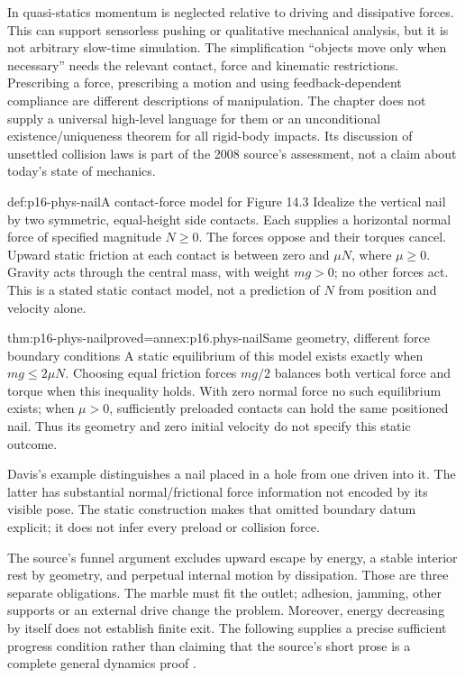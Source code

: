 In quasi-statics momentum is neglected relative to driving and dissipative
forces. This can support sensorless pushing or qualitative mechanical
analysis, but it is not arbitrary slow-time simulation. The simplification
``objects move only when necessary'' needs the relevant contact, force and
kinematic restrictions. Prescribing a force, prescribing a motion and using
feedback-dependent compliance are different descriptions of manipulation.
The chapter does not supply a universal high-level language for them or an
unconditional existence/uniqueness theorem for all rigid-body impacts.
Its discussion of unsettled collision laws is part of the 2008 source's
assessment, not a claim about today's state of mechanics.

\begin{hbdefinition}{def:p16-phys-nail}{A contact-force model for Figure 14.3}
Idealize the vertical nail by two symmetric, equal-height side contacts.
Each supplies a horizontal normal force of specified magnitude \(N\ge0\).
The forces oppose and their torques cancel. Upward static friction at each
contact is between zero and \(\mu N\), where \(\mu\ge0\).
Gravity acts through the central mass, with weight \(mg>0\); no other
forces act. This is a stated static contact model, not a prediction of
\(N\) from position and velocity alone.
\end{hbdefinition}

\begin{hbtheorem}{thm:p16-phys-nail}{proved=annex:p16.phys-nail}{Same geometry, different force boundary conditions}
A static equilibrium of this model exists exactly when \(mg\le2\mu N\).
Choosing equal friction forces \(mg/2\) balances both vertical force and
torque when this inequality holds. With zero normal force no such equilibrium
exists; when \(\mu>0\), sufficiently preloaded contacts can hold the same
positioned nail.
Thus its geometry and zero initial velocity do not specify this static outcome.
\end{hbtheorem}

Davis's example distinguishes a nail placed in a hole from one driven into
it. The latter has substantial normal/frictional force information not
encoded by its visible pose. The static construction makes that omitted
boundary datum explicit; it does not infer every preload or collision force.

The source's funnel argument excludes upward escape by energy, a stable
interior rest by geometry, and perpetual internal motion by dissipation.
Those are three separate obligations. The marble must fit the outlet;
adhesion, jamming, other supports or an external drive change the problem.
Moreover, energy decreasing by itself does not establish finite exit.
The following supplies a precise sufficient progress condition rather than
claiming that the source's short prose is a complete general dynamics proof
\cite[pp.~608,615, referral~9]{Davis2008PhysicalReasoning}.

